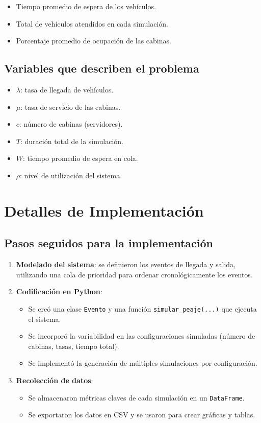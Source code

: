 \documentclass[12pt]{article}
\begin{document}
\begin{itemize}
    \item Tiempo promedio de espera de los vehículos.
    \item Total de vehículos atendidos en cada simulación.
    \item Porcentaje promedio de ocupación de las cabinas.
\end{itemize}

\subsection*{Variables que describen el problema}
\begin{itemize}
    \item $\lambda$: tasa de llegada de vehículos.
    \item $\mu$: tasa de servicio de las cabinas.
    \item $c$: número de cabinas (servidores).
    \item $T$: duración total de la simulación.
    \item $W$: tiempo promedio de espera en cola.
    \item $\rho$: nivel de utilización del sistema.
\end{itemize}

\section{Detalles de Implementación}

\subsection*{Pasos seguidos para la implementación}
\begin{enumerate}
    \item \textbf{Modelado del sistema}: se definieron los eventos de llegada y salida, utilizando una cola de prioridad para ordenar cronológicamente los eventos.
    \item \textbf{Codificación en Python}:
        \begin{itemize}
            \item Se creó una clase \texttt{Evento} y una función \texttt{simular\_peaje(...)} que ejecuta el sistema.
            \item Se incorporó la variabilidad en las configuraciones simuladas (número de cabinas, tasas, tiempo total).
            \item Se implementó la generación de múltiples simulaciones por configuración.
        \end{itemize}
    \item \textbf{Recolección de datos}:
        \begin{itemize}
            \item Se almacenaron métricas claves de cada simulación en un \texttt{DataFrame}.
            \item Se exportaron los datos en CSV y se usaron para crear gráficas y tablas.
        \end{itemize}
\end{enumerate}
\end{document}
